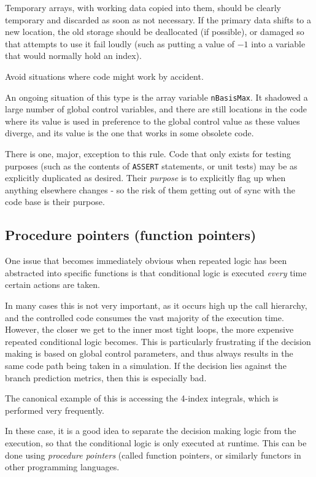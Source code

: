 \documentclass[a4paper,notitlepage]{scrreprt}
\let\code\lstinline
\begin{document}
\begin{description}
			Temporary arrays, with working data copied into them, should be
			clearly temporary and discarded as soon as not necessary. If the
			primary data shifts to a new location, the old storage should be
			deallocated (if possible), or damaged so that attempts to use it
			fail loudly (such as putting a value of $-1$ into a variable that
			would normally hold an index).

			Avoid situations where code might work by accident.

			An ongoing situation of this type is the array variable
			\code{nBasisMax}. It shadowed a large number of global control
			variables, and there are still locations in the code where its
			value is used in preference to the global control value as these
			values diverge, and its value is the one that works in some
			obsolete code.
	\end{description}

	There is one, major, exception to this rule. Code that only exists for
	testing purposes (such as the contents of \code{ASSERT} statements,
	or unit tests) may be as explicitly duplicated as
	desired. Their \emph{purpose} is to explicitly flag up when anything
	elsewhere changes - so the risk of them getting out of sync with the code
	base is their purpose.

	\subsection{Procedure pointers (function pointers)}
		One issue that becomes immediately obvious when repeated logic has
		been abstracted into specific functions is that conditional logic is
		executed \emph{every} time certain actions are taken.

		In many cases this is not very important, as it occurs high up the
		call hierarchy, and the controlled code consumes the vast majority of
		the execution time. However, the closer we get to the inner most tight
		loops, the more expensive repeated conditional logic becomes. This
		is particularly frustrating if the decision making is based on global
		control parameters, and thus always results in the same code path being
		taken in a simulation. If the decision lies against the branch
		prediction metrics, then this is especially bad.

		The canonical example of this is accessing the 4-index integrals, which
		is performed very frequently.

		In these case, it is a good idea to separate the decision making logic
		from the execution, so that the conditional logic is only executed at
		runtime. This can be done using \emph{procedure pointers} (called
		function pointers, or similarly functors in other programming
		languages.
\end{document}
